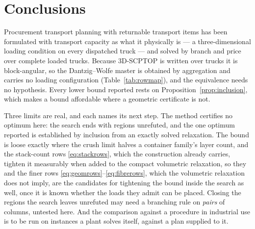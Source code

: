 \section{Conclusions}
\label{sec:conclusions}

Procurement transport planning with returnable transport items has
been formulated with transport capacity as what it physically is --- a
three-dimensional loading condition on every dispatched truck --- and
solved by branch and price over complete loaded trucks. Because
3D-SCPTOP is written over trucks it is block-angular, so the
Dantzig--Wolfe master is obtained by aggregation and carries no loading
configuration (Table~\ref{tab:rowmap}), and the equivalence needs no
hypothesis. Every lower bound reported rests on
Proposition~\ref{prop:inclusion}, which makes a bound affordable where
a geometric certificate is not. 

Three limits are real, and each names its next step. The method
certifies no optimum here: the search ends with regions unrefuted, and the
one optimum reported is established by inclusion from an exactly solved
relaxation. The bound is loose exactly where the crush limit halves a
container family's layer count, and the stack-count rows
\eqref{eq:stackrows}, which the construction already carries, tighten
it measurably when added to the compact volumetric relaxation, so they
and the finer rows \eqref{eq:geomrows}--\eqref{eq:fibrerows}, which the
volumetric relaxation does not imply, are the candidates for tightening
the bound inside the search as well, once it is known whether the loads
they admit can be placed. Closing the regions the search
leaves unrefuted may need a branching rule on \emph{pairs} of columns,
untested here. And the comparison against a procedure in industrial use is to
be run on instances a plant solves itself, against a plan supplied to
it.


